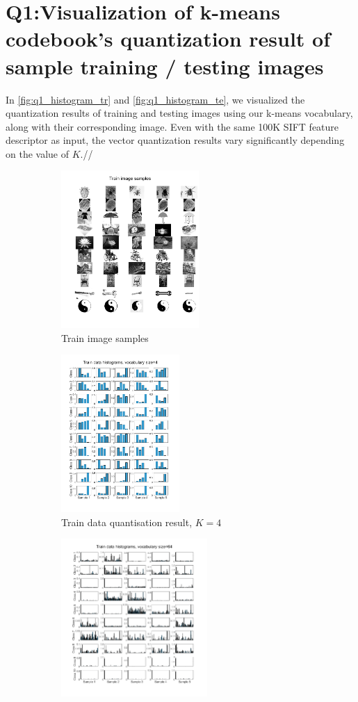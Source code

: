 \section{Q1:Visualization of k-means codebook's quantization result of sample training / testing images}
\label{subsec:Q1_histograms}
In \cref{fig:q1_histogram_tr} and \cref{fig:q1_histogram_te}, we visualized the quantization results of training and testing images using our k-means vocabulary, along with their corresponding image. Even with the same 100K SIFT feature descriptor as input, the vector quantization results vary significantly depending on the value of $K$.//

\begin{figure}[htbp]
	\centering
	\begin{subfigure}[t]{0.3\linewidth}
		\centering
		\includegraphics[height=6cm]{image/q1-appendix/train_img.png} 
		\caption{Train image samples}
	\end{subfigure}%
	\hfill
	\begin{subfigure}[t]{0.3\linewidth}
		\centering
		\includegraphics[height=6cm]{image/q1-appendix/train_4.png}
		\caption{Train data quantisation result, $K=4$}
	\end{subfigure}
	\hfill
	\begin{subfigure}[t]{0.3\linewidth}
		\centering
		\includegraphics[height=6cm]{image/q1-appendix/train_64.png}

\end{subfigure}
\end{figure}
